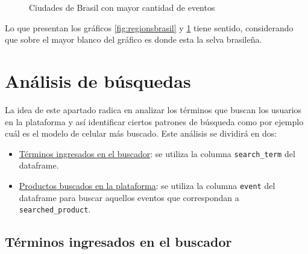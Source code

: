 \documentclass[a4paper]{article}
\begin{document}
\begin{figure}[!h]
	\caption{Ciudades de Brasil con mayor cantidad de eventos}
	\label{fig:citybrasil}
\end{figure}

Lo que presentan los gráficos \ref{fig:regionsbrasil} y \ref{fig:citybrasil} tiene sentido, considerando que sobre el mayor blanco del gráfico es donde esta la selva brasileña.

\section{Análisis de búsquedas} \label{busq}

La idea de este apartado radica en analizar los términos que buscan los usuarios en la plataforma y así identificar ciertos patrones de búsqueda como por ejemplo cuál es el modelo de celular más buscado. Este análisis se dividirá en dos:

\begin{itemize}
	\item \underline{Términos ingresados en el buscador}: se utiliza la columna \texttt{search\_term} del dataframe.
	\item \underline{Productos buscados en la plataforma}: se utiliza la columna \texttt{event} del dataframe para buscar aquellos eventos que correspondan a \texttt{searched\_product}.
 \end{itemize}

\subsection{Términos ingresados en el buscador}
\end{document}
